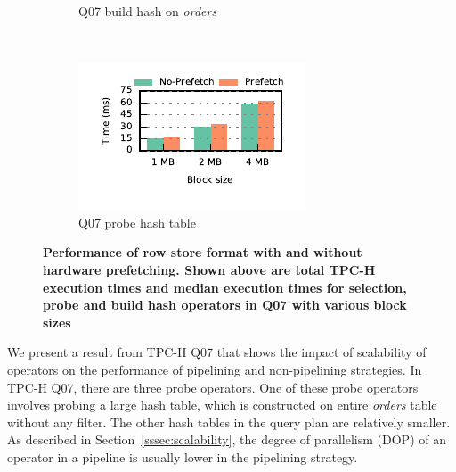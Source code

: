 \begin{figure}[t]
\begin{subfigure}[ht]{0.225\textwidth}
		\caption{Q07 build hash on \textit{orders}}
		\label{fig:prefetching-build-q07}
	\end{subfigure}
	~
	\begin{subfigure}[ht]{0.225\textwidth}
		\includegraphics[width=\textwidth]{pipeline/figures/prefetching-q07-probe-withlip-rowstore}
		\caption{Q07 probe hash table}
		\label{fig:prefetching-probe-q07}
	\end{subfigure}
	\caption{\textbf{Performance of row store format with and without hardware prefetching. Shown above are total TPC-H execution times and median \wo{} execution times for selection, probe and build hash operators in Q07 with various block sizes}}
	\label{fig:prefetching-vs-noprefetching-rowstore}
\end{figure}

We present a result from TPC-H Q07 that shows the impact of scalability of operators on the performance of pipelining and non-pipelining strategies.
In TPC-H Q07, there are three probe operators.
One of these probe operators involves probing a large hash table, which is constructed on entire \textit{orders} table without any filter.
The other hash tables in the query plan are relatively smaller. 
As described in Section~\ref{sssec:scalability}, the degree of parallelism (DOP) of an operator in a pipeline is usually lower in the pipelining strategy.

